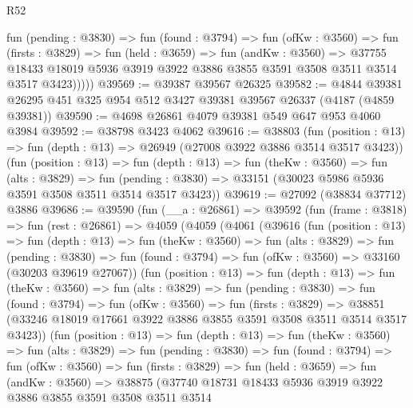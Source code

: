\begin{lexlean}{R52}
\begin{coremodule}
            fun (pending : @3830) =>
            fun (found : @3794) =>
            fun (ofKw : @3560) =>
            fun (firsts : @3829) =>
            fun (held : @3659) =>
            fun (andKw : @3560) =>
            @37755
              @18433
              @18019
              @5936
              @3919
              @3922
              @3886
              @3855
              @3591
              @3508
              @3511
              @3514
              @3517
              @3423)))))
@39569 := @39387 @39567 @26325
@39582 := @4844 @39381 @26295 @451 @325 @954 @512 @3427 @39381 @39567 @26337 (@4187 (@4859 @39381))
@39590 := @4698 @26861 @4079 @39381 @549 @647 @953 @4060 @3984
@39592 := @38798 @3423 @4062
@39616 := @38803
    (fun (position : @13) => fun (depth : @13) => @26949 (@27008 @3922 @3886 @3514 @3517 @3423))
    (fun (position : @13) =>
    fun (depth : @13) =>
    fun (theKw : @3560) =>
    fun (alts : @3829) =>
    fun (pending : @3830) => @33151 (@30023 @5986 @5936 @3591 @3508 @3511 @3514 @3517 @3423))
@39619 := @27092 (@38834 @37712) @3886
@39686 := @39590
    (fun (__a : @26861) =>
    @39592
      (fun (frame : @3818) =>
      fun (rest : @26861) =>
      @4059
        (@4059
          (@4061
            (@39616
              (fun (position : @13) =>
              fun (depth : @13) =>
              fun (theKw : @3560) =>
              fun (alts : @3829) =>
              fun (pending : @3830) =>
              fun (found : @3794) => fun (ofKw : @3560) => @33160 (@30203 @39619 @27067))
              (fun (position : @13) =>
              fun (depth : @13) =>
              fun (theKw : @3560) =>
              fun (alts : @3829) =>
              fun (pending : @3830) =>
              fun (found : @3794) =>
              fun (ofKw : @3560) =>
              fun (firsts : @3829) =>
              @38851 (@33246 @18019 @17661 @3922 @3886 @3855 @3591 @3508 @3511 @3514 @3517 @3423))
              (fun (position : @13) =>
              fun (depth : @13) =>
              fun (theKw : @3560) =>
              fun (alts : @3829) =>
              fun (pending : @3830) =>
              fun (found : @3794) =>
              fun (ofKw : @3560) =>
              fun (firsts : @3829) =>
              fun (held : @3659) =>
              fun (andKw : @3560) =>
              @38875
                (@37740
                  @18731
                  @18433
                  @5936
                  @3919
                  @3922
                  @3886
                  @3855
                  @3591
                  @3508
                  @3511
                  @3514

\end{coremodule}
\end{lexlean}
